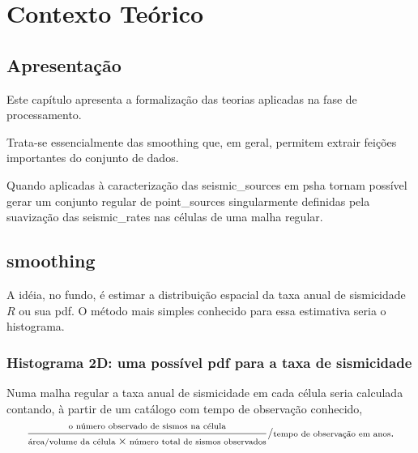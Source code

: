 \chapter{Contexto Teórico}
\label{cap:teoria}


\section{Apresentação}
\label{sec:c04_apresentacao}

Este capítulo apresenta a formalização das teorias aplicadas na fase de
processamento. 

Trata-se essencialmente das \gls{smoothing} que, em geral, permitem extrair 
feições importantes do conjunto de dados.

Quando aplicadas à caracterização das \glspl{seismic_source} em \gls{psha}
tornam possível gerar um conjunto regular de \glspl{point_source} 
singularmente definidas pela suavização das \glspl{seismic_rate} 
nas células de uma malha regular.


\section{\Gls{smoothing}}
\label{sec:04_smoothing_general}

A idéia, no fundo, é estimar a distribuição espacial da taxa anual de sismicidade $R$
ou sua \gls{pdf}.
O método mais simples conhecido para essa estimativa seria o histograma.

\subsection{Histograma 2D: uma possível \gls{pdf} para a  taxa de sismicidade}

Numa malha regular a taxa anual de sismicidade em cada célula seria calculada 
contando, à partir de um catálogo com tempo de observação conhecido,
\begin{equation}
\scriptsize
	\ensuremath{
	\frac{\text{o número observado de sismos na célula}}
		 {\text{área/volume da célula} \times 
		  \text{número total de sismos observados}}
	/
	\text{tempo de observação em anos}
	}
\normalsize.
\label{eq:rate_count}
\end{equation}

